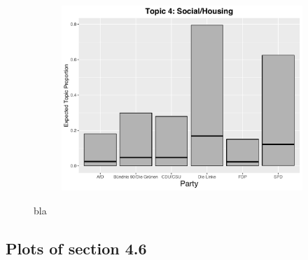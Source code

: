 \begin{figure}[h!]
\begin{subfigure}[b]{0.3\linewidth}
    \includegraphics[width=\linewidth]{../plots/appendix/4_4/direct_t4_cat.pdf}
  \end{subfigure}
  \caption{bla}
  \label{fig:coffee}
\end{figure}


\subsection*{Plots of section 4.6}

